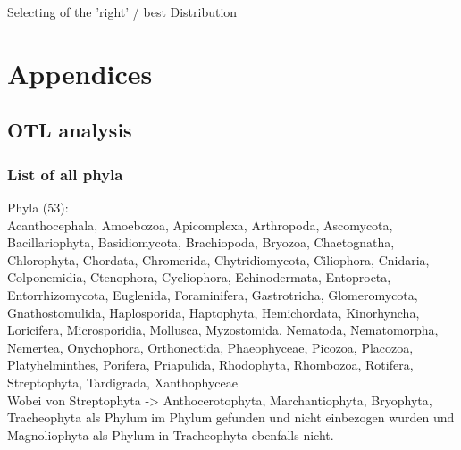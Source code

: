   Selecting of the 'right'  / best Distribution
  


\chapter{Appendices}
  \section{OTL analysis}\label{sec:otl analysis}

    \subsection{List of all phyla}\label{subsec:listPhyla}

    Phyla (53): \\
    Acanthocephala, Amoebozoa, Apicomplexa, Arthropoda, Ascomycota, Bacillariophyta, Basidiomycota, 
      Brachiopoda, Bryozoa, Chaetognatha, Chlorophyta, Chordata, Chromerida, Chytridiomycota, 
      Ciliophora, Cnidaria, Colponemidia, Ctenophora, Cycliophora, Echinodermata, Entoprocta, 
      Entorrhizomycota, Euglenida, Foraminifera, Gastrotricha, Glomeromycota, Gnathostomulida, 
      Haplosporida, Haptophyta, Hemichordata, Kinorhyncha, Loricifera, Microsporidia, Mollusca, 
      Myzostomida, Nematoda, Nematomorpha, Nemertea, Onychophora, Orthonectida, Phaeophyceae, 
      Picozoa, Placozoa, Platyhelminthes, Porifera, Priapulida, Rhodophyta, Rhombozoa, Rotifera, 
      Streptophyta, Tardigrada, Xanthophyceae \\
    Wobei von Streptophyta -> Anthocerotophyta, Marchantiophyta, Bryophyta, Tracheophyta als
      Phylum im Phylum gefunden und nicht einbezogen wurden und Magnoliophyta als Phylum in 
      Tracheophyta ebenfalls nicht. \\

